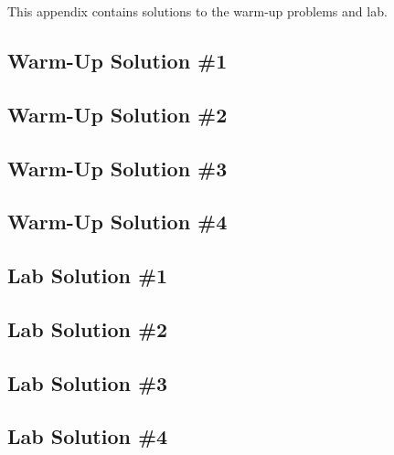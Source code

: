This appendix contains solutions to the warm-up problems and lab.

\subsection{Warm-Up Solution \#1}
\label{app:warm-up-solution-1}


\subsection{Warm-Up Solution \#2}
\label{app:warm-up-solution-2}


\subsection{Warm-Up Solution \#3}
\label{app:warm-up-solution-3}


\subsection{Warm-Up Solution \#4}
\label{app:warm-up-solution-4}


\subsection{Lab Solution \#1}
\label{app:lab-solution-1}


\subsection{Lab Solution \#2}
\label{app:lab-solution-2}


\subsection{Lab Solution \#3}
\label{app:lab-solution-3}


\subsection{Lab Solution \#4}
\label{app:lab-solution-4}
